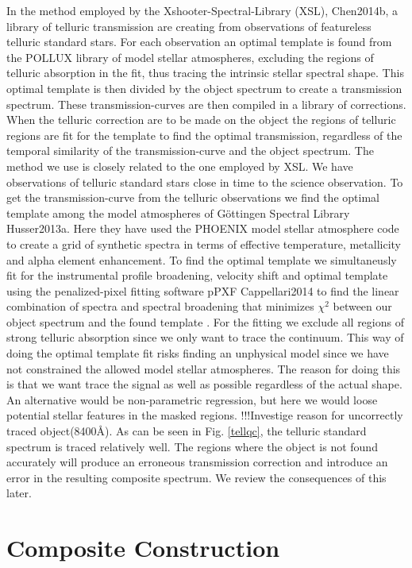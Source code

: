 \documentclass[iop]{emulateapj}
\begin{document}
In the method employed by the Xshooter-Spectral-Library (XSL), Chen2014b, a library of telluric transmission are creating from observations of featureless telluric standard stars. For each observation an optimal template is found from the POLLUX library of model stellar atmospheres, excluding the regions of telluric absorption in the fit, thus tracing the intrinsic stellar spectral shape. This optimal template is then divided by the object spectrum to create a transmission spectrum. These transmission-curves are then compiled in a library of corrections. When the telluric correction are to be made on the object the regions of telluric regions are fit for the template to find the optimal transmission, regardless of the temporal similarity of the transmission-curve and the object spectrum. The method we use is closely related to the one employed by XSL. We have observations of telluric standard stars close in time to the science observation. To get the transmission-curve from the telluric observations we find the optimal template among the model atmospheres of Göttingen Spectral Library Husser2013a. Here they have used the PHOENIX model stellar atmosphere code to create a grid of synthetic spectra in terms of effective temperature, metallicity and alpha element enhancement. To find the optimal template we simultaneusly fit for the instrumental profile broadening, velocity shift and optimal template using the penalized-pixel fitting software pPXF Cappellari2014 to find the linear combination of spectra and spectral broadening that minimizes $\chi ^2$ between our object spectrum and the found template . For the fitting we exclude all regions of strong telluric absorption since we only want to trace the continuum. This way of doing the optimal template fit risks finding an unphysical model since we have not constrained the allowed model stellar atmospheres. The reason for doing this is that we want trace the signal as well as possible regardless of the actual shape. An alternative would be non-parametric regression, but here we would loose potential stellar features in the masked regions. !!!Investige reason for uncorrectly traced object(8400\r{A}). As can be seen in Fig. \ref{tellqc}, the telluric standard spectrum is traced relatively well. The regions where the object is not found accurately will produce an erroneous transmission correction and introduce an error in the resulting composite spectrum. We review the consequences of this later. 




\section{Composite Construction}
\end{document}

